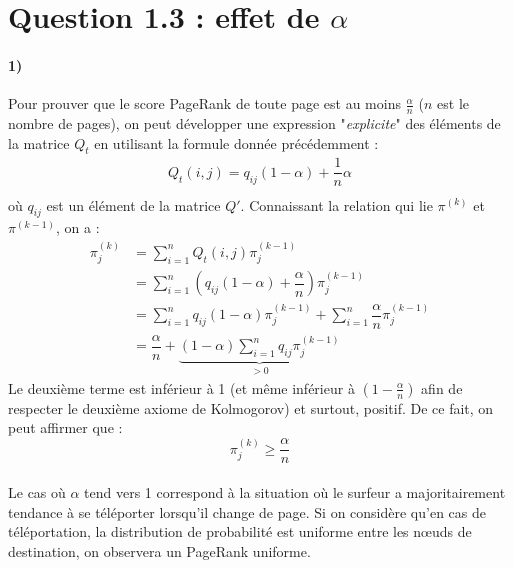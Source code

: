 \documentclass[a4paper,titlepage]{report}
\begin{document}
\section{Question 1.3 : effet de $\alpha$}
\paragraph{1)}
Pour prouver que le score PageRank de toute page est au moins $\frac{\alpha}{n}$ ($n$ est le nombre de pages), on peut développer une expression "\textit{explicite}" des éléments de la matrice $Q_t$ en utilisant la formule donnée précédemment : 
\[
\begin{aligned}
Q_t(i,j) = q_{ij} (1 - \alpha) + \dfrac{1}{n}\alpha\\
\end{aligned}
\]
où $q_{ij}$ est un élément de la matrice $Q'$. Connaissant la relation qui lie $\pi^{(k)}$ et $\pi^{(k-1)}$, on a :
\[
\begin{aligned}
\pi^{(k)}_j &= \sum\limits_{i = 1}^n Q_t(i,j)\pi^{(k-1)}_j\\
 &= \sum\limits_{i = 1}^n \left(q_{ij} (1 - \alpha) + \dfrac{\alpha}{n}\right)\pi^{(k-1)}_j\\
 &= \sum\limits_{i = 1}^n q_{ij} (1 - \alpha) \pi^{(k-1)}_j + \sum\limits_{i = 1}^n \dfrac{\alpha}{n} \pi^{(k-1)}_j\\
 &= \dfrac{\alpha}{n} + \underbrace{(1 - \alpha) \sum\limits_{i = 1}^n q_{ij} \pi^{(k-1)}_j}_{> 0}
\end{aligned}
\]
Le deuxième terme est inférieur à 1 (et même inférieur à $(1 - \frac{\alpha}{n})$ afin de respecter le deuxième axiome de Kolmogorov) et surtout, positif. De ce fait, on peut affirmer que :
\[
\pi^{(k)}_j \geq \dfrac{\alpha}{n}
\]
\paragraph{}
Le cas où $\alpha$ tend vers 1 correspond à la situation où le surfeur a majoritairement tendance à se téléporter lorsqu'il change de page. Si on considère qu'en cas de téléportation, la distribution de probabilité est uniforme entre les nœuds de destination, on observera un PageRank uniforme. 
\end{document}
